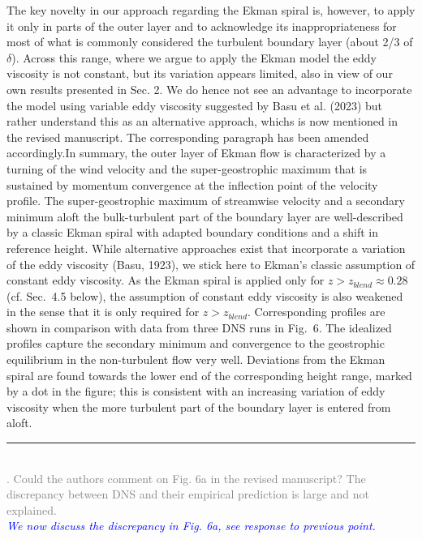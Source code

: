 \documentclass[a4paper,10pt]{article}
\newcommand{\revpoint}[3] 
{ \hrule ~\\[0.5em]
\noindent\textcolor{gray}{\noindent#1} \\[0.5em]  
\noindent\textcolor{blue}{\textit{\noindent#2}} \\[0.5em]
\noindent\textcolor{black}{\noindent{#3}} \\[0.5em]
}
\begin{document}
{  The key novelty in our approach regarding the Ekman spiral is, however, to apply it only in parts of the outer layer and to acknowledge its inappropriateness for most of what is commonly considered the turbulent boundary layer (about 2/3 of $\delta$). Across this range, where we argue to apply the Ekman model the eddy viscosity is not constant, but its variation appears limited, also in view of our own results presented in Sec. 2. We do hence not see an advantage to incorporate the model using variable eddy viscosity suggested by Basu et al. (2023) but rather understand this as an alternative approach, whichs is now mentioned in the revised manuscript. The corresponding paragraph has been amended accordingly.}{In summary, the outer layer of Ekman flow is characterized by a turning of the wind velocity and the super-geostrophic maximum that is sustained by momentum convergence at the inflection point of the velocity profile.
  The super-geostrophic maximum of streamwise velocity and a secondary minimum aloft the bulk-turbulent part of
  the boundary layer are well-described by a classic Ekman spiral with adapted boundary conditions and a shift
  in reference height.
  While alternative approaches exist that incorporate a variation of the eddy viscosity (Basu, 1923), 
  we stick here to Ekman's classic assumption of constant eddy viscosity. 
  As the Ekman spiral is applied only for $z>z_{blend}\approx 0.28$ (cf. Sec.~4.5 below), the assumption of constant eddy viscosity is also weakened in the sense that it is only required for 
  $z>z_{blend}$. 
  Corresponding profiles are shown in comparison with data from three DNS runs in Fig.~6.
  The idealized profiles capture the secondary minimum and convergence to the geostrophic equilibrium in the
  non-turbulent flow very well.
  Deviations from the Ekman spiral are found towards the lower end of the corresponding height range, 
  marked by a dot in the figure; this is consistent with an increasing variation of eddy viscosity when 
  the more turbulent part of the boundary layer is entered from aloft.}

\revpoint{3. Could the authors comment on Fig. 6a in the revised manuscript? The discrepancy between DNS and
  their empirical prediction is large and not explained.
}{We now discuss the discrepancy in Fig. 6a, see response to previous point.}{}
\end{document}
